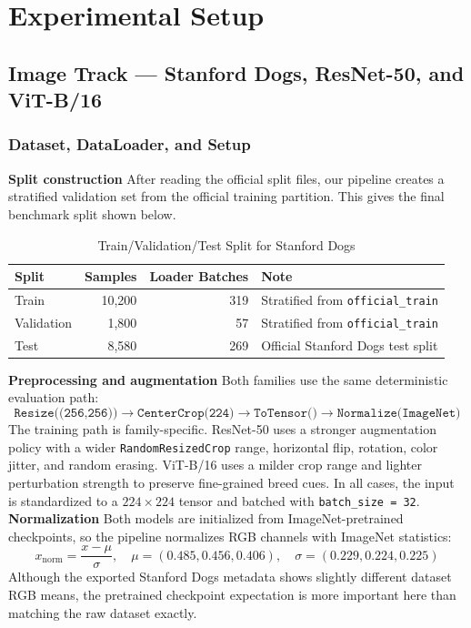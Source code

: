 \documentclass[twoside,final]{hcmut-report}
\begin{document}
\section{Experimental Setup}

\subsection{Image Track --- Stanford Dogs, ResNet-50, and ViT-B/16}

\subsubsection{Dataset, DataLoader, and Setup}
\noindent \textbf{Split construction} After reading the official split files, our pipeline creates a stratified validation set from the official training partition. This gives the final benchmark split shown below.

\begin{table}[H]
\centering
\caption{Train/Validation/Test Split for Stanford Dogs}
\begin{tabular}{lrrl}
\toprule
\textbf{Split} & \textbf{Samples} & \textbf{Loader Batches} & \textbf{Note} \\
\midrule
Train & 10,200 & 319 & Stratified from \texttt{official\_train} \\
Validation & 1,800 & 57 & Stratified from \texttt{official\_train} \\
Test & 8,580 & 269 & Official Stanford Dogs test split \\
\bottomrule
\end{tabular}
\label{tab:stanford_dogs_split}
\end{table}

\noindent \textbf{Preprocessing and augmentation} Both families use the same deterministic evaluation path:
\[
\texttt{Resize((256,256))} \rightarrow \texttt{CenterCrop(224)} \rightarrow \texttt{ToTensor()} \rightarrow \texttt{Normalize(ImageNet)}
\]
The training path is family-specific. ResNet-50 uses a stronger augmentation policy with a wider \texttt{RandomResizedCrop} range, horizontal flip, rotation, color jitter, and random erasing. ViT-B/16 uses a milder crop range and lighter perturbation strength to preserve fine-grained breed cues. In all cases, the input is standardized to a $224 \times 224$ tensor and batched with \texttt{batch\_size = 32}.\\

\noindent \textbf{Normalization} Both models are initialized from ImageNet-pretrained checkpoints, so the pipeline normalizes RGB channels with ImageNet statistics:
\[
x_{\mathrm{norm}} = \frac{x - \mu}{\sigma}, \quad
\mu=(0.485, 0.456, 0.406), \quad
\sigma=(0.229, 0.224, 0.225)
\]
Although the exported Stanford Dogs metadata shows slightly different dataset RGB means, the pretrained checkpoint expectation is more important here than matching the raw dataset exactly.\\
\end{document}
